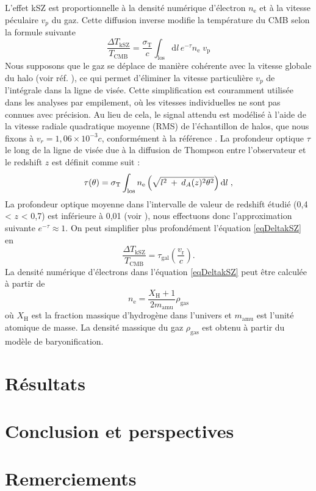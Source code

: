 \documentclass[a4paper, french, twoside, twocolumn, 11 pt]{article}
\newcommand{\deriv}{\mathrm{d}}
\begin{document}
L'effet kSZ est proportionnelle à la densité numérique d'électron $n_\text{e}$ et à la vitesse péculaire $v_p$ du gaz.
Cette diffusion inverse modifie la température du CMB selon la formule suivante
\begin{equation}
\label{eqDeltakSZ}
\frac{\Delta T_\text{kSZ}}{T_\text{CMB}}=\frac{\sigma_\text{T}}{c}\int_\text{los} \deriv l\,e^{-\tau} n_\text{e} \; v_\text{p}
\end{equation}
Nous supposons que le gaz se déplace de manière cohérente avec la vitesse globale du halo (voir réf. \cite{Hadzhiyska2023}), ce qui permet d'éliminer la vitesse particulière $v_p$ de l'intégrale dans la ligne de visée. Cette simplification est couramment utilisée dans les analyses par empilement, où les vitesses individuelles ne sont pas connues avec précision. Au lieu de cela, le signal attendu est modélisé à l'aide de la vitesse radiale quadratique moyenne (RMS) de l'échantillon de halos, que nous fixons à $v_r = 1,06 \times 10^{-3}c$, conformément à la référence \cite{Amodeo2021}. La profondeur optique $\tau$ le long de la ligne de visée due à la diffusion de Thompson entre l'observateur et le redshift $z$ est définit comme suit :
\begin{equation}
\tau(\theta) =  \sigma_\mathrm{T} \int_{\rm los} n_{\mathrm{e}}\left(\sqrt{l^2\:+\:d_A(z)^2\theta^2}\right)\deriv l\;,
\end{equation}
La profondeur optique moyenne dans l'intervalle de valeur de redshift étudié (0,4 < $z$ < 0,7) est inférieure à 0,01 (voir \cite{Adam_2016}), nous effectuons donc l'approximation suivante $e^{-\tau}\approx1$. On peut simplifier plus profondément l'équation \ref{eqDeltakSZ} en
\begin{equation}
\frac{\Delta T_{\mathrm{kSZ}}}{T_{\mathrm{CMB}}}=\tau_{\mathrm{gal}}\left(\frac{v_\mathrm{r}}{c}\right).
\end{equation}
La densité numérique d'électrons dans l'équation \ref{eqDeltakSZ} peut être calculée à partir de
\begin{equation}
n_\mathrm{e} = \frac{X_\mathrm{H} + 1}{2 m_\mathrm{amu}} \rho_\mathrm{gas}
\end{equation}
où $X_\mathrm{H}$ est la fraction massique d'hydrogène dans l'univers et $m_\mathrm{amu}$ est l'unité atomique de masse. La densité massique du gaz $\rho_\mathrm{gas}$ est obtenu à partir du modèle de baryonification.
\section{Résultats}
\section{Conclusion et perspectives}
\section{Remerciements}

\medskip
\printbibliography[
title={Références}
]
\end{document}
